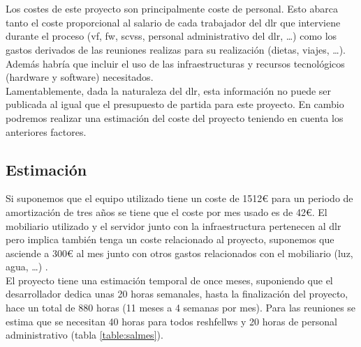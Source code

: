 \section{}
Los costes de este proyecto son principalmente coste de personal. Esto abarca tanto el coste proporcional al salario de cada trabajador del \gls{dlr} que interviene durante el proceso (\gls{vf}, \gls{fw}, \gls{scvss}, personal administrativo del \gls{dlr}, \dots) como los gastos derivados de las reuniones realizas para su realización (dietas, viajes, \dots).\\

Además habría que incluir el uso de las infraestructuras y recursos tecnológicos (\gls{hardware} y \gls{software}) necesitados.\\

Lamentablemente, dada la naturaleza del \gls{dlr}, esta información no puede ser publicada al igual que el presupuesto de partida para este proyecto. En cambio podremos realizar una estimación del coste del proyecto teniendo en cuenta los anteriores factores.\\

\subsection{Estimación}

Si suponemos que el equipo utilizado tiene un coste de 1512\euro{} para un periodo de amortización de tres años se tiene que el coste por mes usado es de 42\euro{}. El mobiliario utilizado y el servidor junto con la infraestructura pertenecen al \gls{dlr} pero implica también tenga un coste relacionado al proyecto, suponemos que asciende a 300\euro{} al mes junto con otros gastos relacionados con el mobiliario (luz, agua, \dots) .\\


El proyecto tiene una estimación temporal de once meses, suponiendo que el desarrollador dedica unas 20 horas semanales, hasta la finalización del proyecto, hace un total de 880 horas (11 meses a 4 semanas por mes). Para las reuniones se estima que se necesitan 40 horas para todos \glspl{reshfellw} y 20 horas de personal administrativo (tabla \ref{table:salmes}).\\

